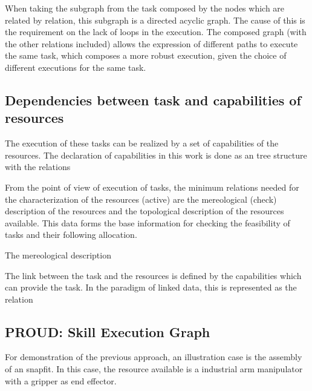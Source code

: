 \documentclass[a4paper,10pt]{article}
\begin{document}
When taking the subgraph from the task composed by the nodes which are related by  relation, this subgraph is a directed acyclic graph. The cause of this is the requirement on the lack of loops in the execution. 
The composed graph (with the other relations included) allows the expression of different paths to execute the same task, which composes a more robust execution, given the choice of different executions for the same task.

\subsection{Dependencies between task and capabilities of resources}

The execution of these tasks can be realized by a set of capabilities of the resources. 
The declaration of capabilities in this work is done as an tree structure with the relations 

From the point of view of execution of tasks, the minimum relations needed for the characterization of the resources (active) %
are the mereological (check) description of the resources and the topological description of the resources available. This data forms the base information for checking the feasibility of tasks and their following allocation.

The mereological description 



The link between the task and the resources is defined by the capabilities which can provide the task. In the paradigm of linked data, this is represented as the relation %


\subsection{PROUD: Skill Execution Graph}

For demonstration of the previous approach, an illustration case is the assembly of an snapfit. In this case, the resource available is a industrial arm manipulator with a gripper as end effector.
\end{document}
